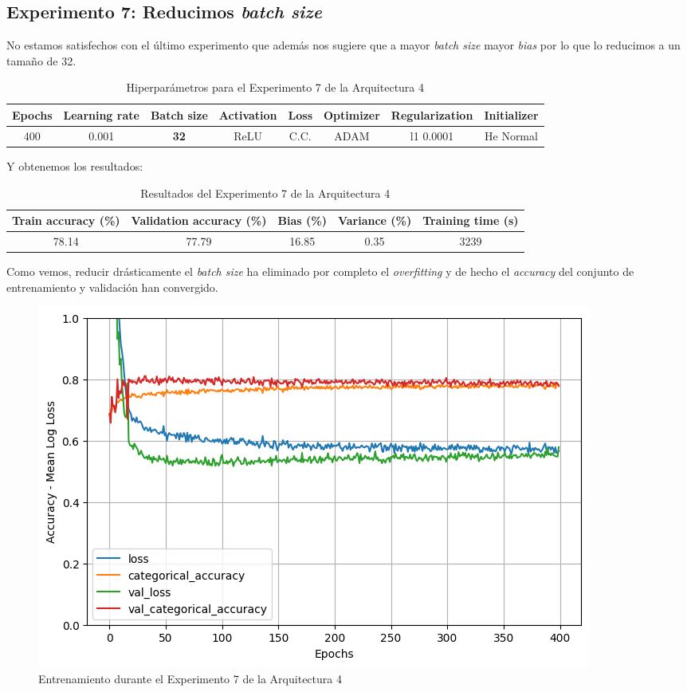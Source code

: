 \documentclass{article}
\begin{document}
        \subsection{Experimento 7: Reducimos \textit{batch size}}
        \label{d-s-a4-e7}
			No estamos satisfechos con el \'ultimo experimento que adem\'as nos sugiere que a mayor \textit{batch size} mayor \textit{bias} por lo que lo reducimos a un tama\~no de 32.
			
			\begin{table}[!h]
				\begin{tabular}{|c|c|c|c|c|c|c|c|}
					\textbf{Epochs}&\textbf{Learning rate}&\textbf{Batch size}&\textbf{Activation}&\textbf{Loss}&\textbf{Optimizer}&\textbf{Regularization}  & \textbf{Initializer} \\ \hline
					400 & 0.001 & \textbf{32} & ReLU & C.C. & ADAM & l1 0.0001 & He Normal
				\end{tabular}
				\caption{Hiperpar\'ametros para el Experimento 7 de la Arquitectura 4}
				\label{tab:hip-d-a4-e7}
			\end{table}
			Y obtenemos los resultados:
			\begin{table}[!h]
				\begin{center}
					\begin{tabular}{| c | c | c | c | c |}
						\textbf{Train accuracy (\%)} & \textbf{Validation accuracy (\%)} & \textbf{Bias (\%)} & \textbf{Variance (\%)} & \textbf{Training time (s)} \\ \hline
						78.14 & 77.79 & 16.85 & 0.35 & 3239 \\ \hline
					\end{tabular}
					\caption{Resultados del Experimento 7 de la Arquitectura 4}
					\label{tab:res-d-a4-e7}
				\end{center}
			\end{table}
   
			Como vemos, reducir dr\'asticamente el \textit{batch size} ha eliminado por completo el \textit{overfitting} y de hecho el \textit{accuracy} del conjunto de entrenamiento y validaci\'on han convergido.
			\begin{figure}[!h]
				\begin{center}
					\includegraphics[scale=0.5]{d-tr-a4-e7.png}		
					\caption{Entrenamiento durante el Experimento 7 de la Arquitectura 4}	
					\label{d-tr-a4-e7}
				\end{center}
			\end{figure}
\end{document}
